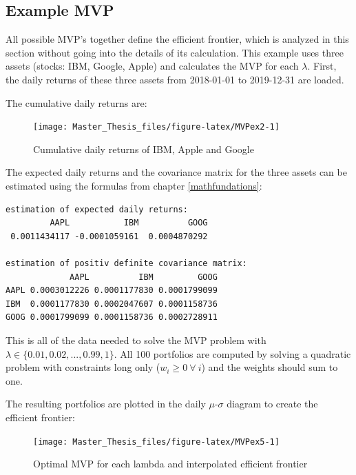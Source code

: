 \documentclass[
  oneside, a4paper, 12pt, openany]{book}
\theoremstyle{definition}
\theoremstyle{definition}
\theoremstyle{definition}
\theoremstyle{definition}
\theoremstyle{remark}
\begin{document}
\hypertarget{example-mvp}{%
\subsection{Example MVP}\label{example-mvp}}

All possible MVP's together define the efficient frontier, which is analyzed in this section without going into the details of its calculation. This example uses three assets (stocks: IBM, Google, Apple) and calculates the MVP for each \(\lambda\). First, the daily returns of these three assets from 2018-01-01 to 2019-12-31 are loaded.

The cumulative daily returns are:

\begin{figure}[H]
\texttt{[image: Master\_Thesis\_files/figure-latex/MVPex2-1]} \caption{Cumulative daily returns of IBM, Apple and Google}\label{fig:MVPex2}
\end{figure}

The expected daily returns and the covariance matrix for the three assets can be estimated using the formulas from chapter \ref{mathfundations}:

\vspace{0.1cm}\fontsize{11}{12}\selectfont

\begin{verbatim}
estimation of expected daily returns:
         AAPL           IBM          GOOG 
 0.0011434117 -0.0001059161  0.0004870292 

estimation of positiv definite covariance matrix:
             AAPL          IBM         GOOG
AAPL 0.0003012226 0.0001177830 0.0001799099
IBM  0.0001177830 0.0002047607 0.0001158736
GOOG 0.0001799099 0.0001158736 0.0002728911
\end{verbatim}

\normalsize\vspace{0.1cm}

This is all of the data needed to solve the MVP problem with \(\lambda \in \{0.01, 0.02, ..., 0.99, 1\}\). All 100 portfolios are computed by solving a quadratic problem with constraints long only (\(w_i \geq 0 \ \forall \ i\)) and the weights should sum to one.

The resulting portfolios are plotted in the daily \(\mu\)-\(\sigma\) diagram to create the efficient frontier:

\begin{figure}[H]
\texttt{[image: Master\_Thesis\_files/figure-latex/MVPex5-1]} \caption{Optimal MVP for each lambda and interpolated efficient frontier}\label{fig:MVPex5}
\end{figure}
\end{document}
